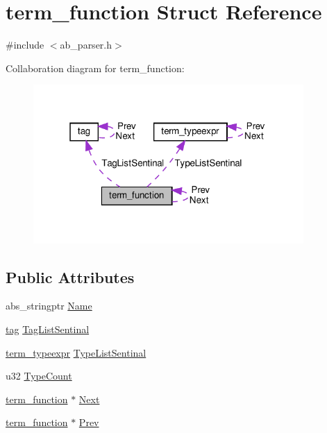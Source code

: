 \hypertarget{structterm__function}{}\section{term\+\_\+function Struct Reference}
\label{structterm__function}


{\ttfamily \#include $<$ab\+\_\+parser.\+h$>$}



Collaboration diagram for term\+\_\+function\+:
\nopagebreak
\begin{figure}[H]
\begin{center}
\leavevmode
\includegraphics[width=292pt]{d0/dd8/structterm__function__coll__graph}
\end{center}
\end{figure}
\subsection*{Public Attributes}
\begin{DoxyCompactItemize}
\item 
abs\+\_\+stringptr \hyperlink{structterm__function_a44d4f15308d31174ac9443aeefe9544a}{Name}
\item 
\hyperlink{structtag}{tag} \hyperlink{structterm__function_ab3a3bd4264776e6fe2d04b161bd62433}{Tag\+List\+Sentinal}
\item 
\hyperlink{structterm__typeexpr}{term\+\_\+typeexpr} \hyperlink{structterm__function_a96b877553f990184a9da245207de9524}{Type\+List\+Sentinal}
\item 
u32 \hyperlink{structterm__function_a4e47cbfb96047c0ed4e06e87e079fb6a}{Type\+Count}
\item 
\hyperlink{structterm__function}{term\+\_\+function} $\ast$ \hyperlink{structterm__function_a655992a45b7bc18c8208d9a058bb86e6}{Next}
\item 
\hyperlink{structterm__function}{term\+\_\+function} $\ast$ \hyperlink{structterm__function_aab58e6419571c457d2b7563724bed629}{Prev}
\end{DoxyCompactItemize}


